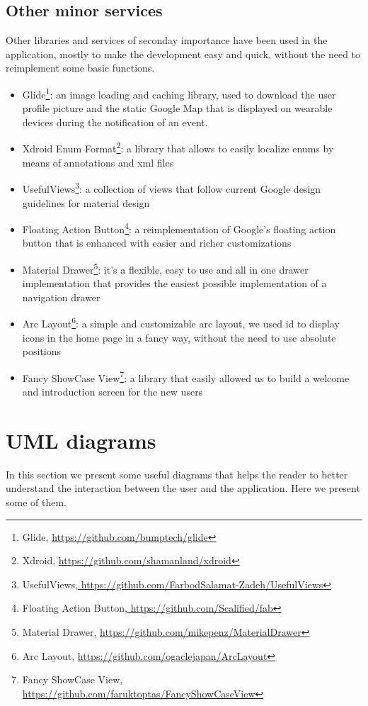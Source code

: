 \documentclass[a4paper]{scrreprt}
\begin{document}
\section{Other minor services}
\par Other libraries and services of seconday importance have been used in the application, mostly to make the development easy and quick, without the need to reimplement some basic functions.
\begin{itemize}
\item Glide\footnote{Glide, \url{https://github.com/bumptech/glide}}: an image loading and caching library, used to download the user profile picture and the static Google Map that is displayed on wearable devices during the notification of an event.
\item Xdroid Enum Format\footnote{Xdroid, \url{https://github.com/shamanland/xdroid}}: a library that allows to easily localize enums by means of annotations and xml files
\item UsefulViews\footnote{UsefulViews,\url{ https://github.com/FarbodSalamat-Zadeh/UsefulViews}}: a collection of views that follow current Google design guidelines for material design
\item Floating Action Button\footnote{Floating Action Button,\url{ https://github.com/Scalified/fab}}: a reimplementation of Google's floating action button that is enhanced with easier and richer customizations
\item Material Drawer\footnote{Material Drawer, \url{https://github.com/mikepenz/MaterialDrawer}}: it's a flexible, easy to use and all in one drawer implementation that provides the easiest possible implementation of a navigation drawer
\item Arc Layout\footnote{Arc Layout, \url{https://github.com/ogaclejapan/ArcLayout}}: a simple and customizable arc layout, we used id to display icons in the home page in a fancy way, without the need to use absolute positions
\item Fancy ShowCase View\footnote{Fancy ShowCase View, \url{https://github.com/faruktoptas/FancyShowCaseView}}: a library that easily allowed us to build a welcome and introduction screen for the new users
\end{itemize}


\chapter{UML diagrams}
In this section we present some useful diagrams that helps the reader to better understand the interaction between the user and the application. Here we present some of them.
\end{document}
